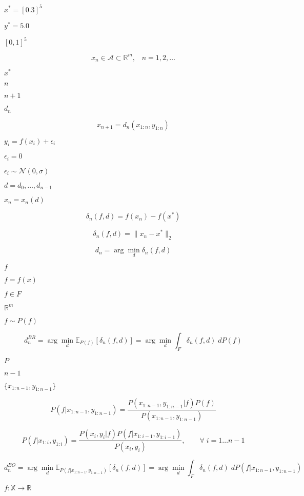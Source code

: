 \documentclass{article}
\begin{document}
$x^* = [0.3]^5$
\pagebreak

$y^* = 5.0$
\pagebreak

$[0,1]^5$
\pagebreak

\[ x_n \in \mathcal{A} \subset \mathbb{R}^m , \;\;\; n = 1,2,\ldots \]
\pagebreak

$x^*$
\pagebreak

$n$
\pagebreak

$n+1$
\pagebreak

$d_n$
\pagebreak

\[ x_{n+1} = d_n(x_{1:n},y_{1:n}) \]
\pagebreak

$y_i = f(x_i) + \epsilon_i$
\pagebreak

$\epsilon_i = 0$
\pagebreak

$\epsilon_i \sim \mathcal{N}(0,\sigma)$
\pagebreak

$d = {d_0,\ldots, d_{n-1}}$
\pagebreak

$x_{n} = x_{n}(d)$
\pagebreak

\[ \delta_n(f,d) = f\left(x_n\right) - f(x^*) \]
\pagebreak

\[ \delta_n(f,d) = \|x_n - x^*\|_2 \label{eq:dist-error} \]
\pagebreak

\[ d_n = \arg \min_d \delta_n(f,d) \]
\pagebreak

$f$
\pagebreak

$f = f(x)$
\pagebreak

$f \in F$
\pagebreak

$\mathbb{R}^m$
\pagebreak

$f \sim P(f)$
\pagebreak

\[ d^{BR}_n = \arg \min_d \mathbb{E}_{P(f)} \left[ \delta_n(f,d)\right]= \arg \min_d \int_F \delta_n(f,d) \; dP(f) \]
\pagebreak

$P$
\pagebreak

$n-1$
\pagebreak

$\{x_{1:n-1},y_{1:n-1}\}$
\pagebreak

\[ P(f|x_{1:n-1},y_{1:n-1}) = \frac{P(x_{1:n-1},y_{1:n-1}|f) P(f)}{P(x_{1:n-1},y_{1:n-1})} \]
\pagebreak

\[ P(f|x_{1:i},y_{1:i}) = \frac{P(x_{i},y_{i}|f) P(f|x_{1:i-1},y_{1:i-1})}{P(x_{i},y_{i})}, \qquad \forall \; i=1 \ldots n-1 \]
\pagebreak

\[ d^{BO}_n = \arg \min_d \mathbb{E}_{P(f|x_{1:n-1},y_{1:n-1})} \left[ \delta_n(f,d)\right] = \arg \min_d \int_F \delta_n(f,d) \; dP(f|x_{1:n-1},y_{1:n-1}) \]
\pagebreak

$f:\mathbb{X} \rightarrow \mathbb{R}$
\pagebreak
\end{document}
